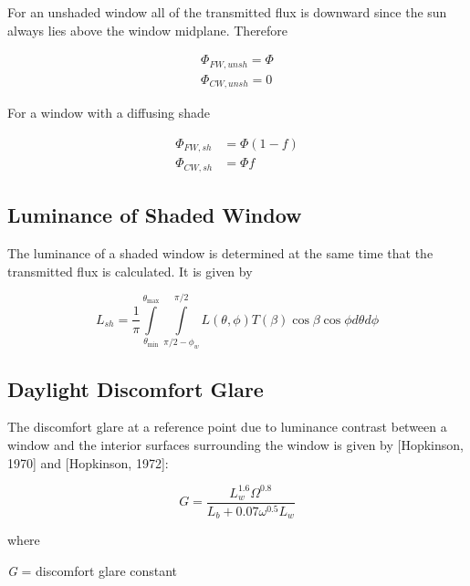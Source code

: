 For an unshaded window all of the transmitted flux is downward since the sun always lies above the window midplane. Therefore

\begin{equation}
\begin{array}{l}
    \Phi_{FW,unsh} = \Phi \\
    \Phi_{CW,unsh} = 0
\end{array}
\end{equation}

For a window with a diffusing shade

\begin{equation}
  \begin{array}{rl}
    \Phi_{FW,sh} &= \Phi (1 - f) \\
    \Phi_{CW,sh} &= \Phi f
  \end{array}
\end{equation}

\subsection{Luminance of Shaded Window}\label{luminance-of-shaded-window}

The luminance of a shaded window is determined at the same time that the transmitted flux is calculated. It is given by

\begin{equation}
{L_{sh}} = \frac{1}{\pi }\int\limits_{{\theta_{\min }}}^{{\theta_{\max }}} {\int\limits_{\pi /2 - {\phi_w}}^{\pi /2} {L(\theta ,\phi )T(\beta )\cos \beta \cos \phi d\theta d\phi } }
\end{equation}

\subsection{Daylight Discomfort Glare}\label{daylight-discomfort-glare}

The discomfort glare at a reference point due to luminance contrast between a window and the interior surfaces surrounding the window is given by {[}Hopkinson, 1970{]} and {[}Hopkinson, 1972{]}:

\begin{equation}
G = \frac{{L_w^{1.6}{\Omega ^{0.8}}}}{{{L_b} + 0.07{\omega ^{0.5}}{L_w}}}
\end{equation}

where

\emph{G} = discomfort glare constant

